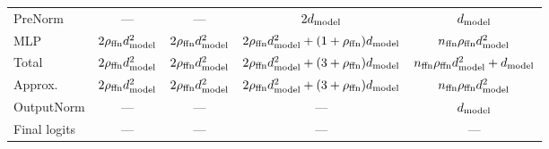 \begin{table}[h]
{\begin{tabular}{lcccc}
			PreNorm      & ---                                      & ---                                      & $2 d_\text{model}$                           & $d_\text{model}$                                 \\
			MLP          & $2 \rho_{\text{ffn}} d_\text{model}^2$                      & $2 \rho_{\text{ffn}} d_\text{model}^2$                      & $2\rho_{\text{ffn}} d_\text{model}^2 + (1+\rho_{\text{ffn}})d_\text{model}$ & $n_\text{ffn} \rho_{\text{ffn}} d_\text{model}^2$                   \\
			Total        & $2 \rho_{\text{ffn}} d_\text{model}^2$                      & $2 \rho_{\text{ffn}} d_\text{model}^2$                      & $2\rho_{\text{ffn}} d_\text{model}^2 + (3+\rho_{\text{ffn}})d_\text{model}$ & $n_\text{ffn} \rho_{\text{ffn}}d_\text{model}^2+d_\text{model}$            \\
			Approx.      & $2 \rho_{\text{ffn}} d_\text{model}^2$                      & $2 \rho_{\text{ffn}} d_\text{model}^2$                      & $2\rho_{\text{ffn}} d_\text{model}^2 + (3+\rho_{\text{ffn}})d_\text{model}$ & $n_\text{ffn} \rho_{\text{ffn}}d_\text{model}^2$                    \\

			\midrule
			OutputNorm   & ---                                      & ---                                      & ---                                   & $d_\text{model}$                                 \\
			Final logits & ---                                      & ---                                      & ---                                   & ---                                       \\
			\bottomrule
		\end{tabular}
	}
\end{table}

